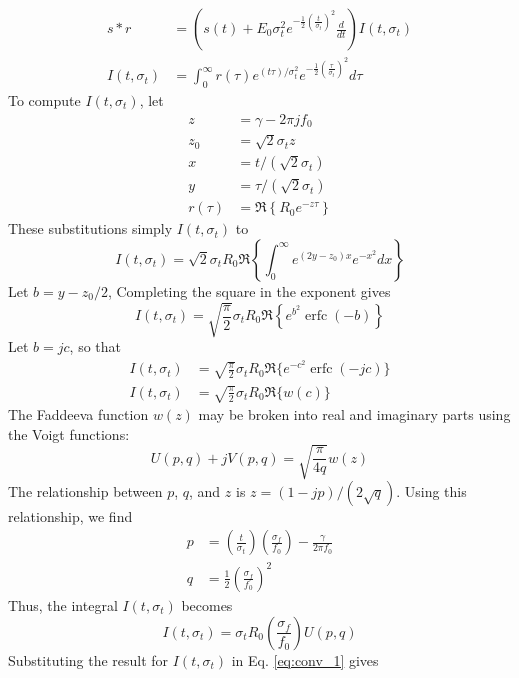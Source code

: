 \documentclass[amsmath,amssymb,aps,prd,10pt,twocolumn,showkeys]{revtex4}
\DeclareMathOperator\erfc{erfc}
\begin{document}
\begin{itemize}
\begin{align}
s * r &= \left(s(t) + E_0 \sigma_t^2 e^{-\frac{1}{2}\left(\frac{t}{\sigma_t}\right)^2} \frac{d}{dt} \right)I(t,\sigma_t) \label{eq:conv_1} \\
I(t,\sigma_t) &= \int_0^{\infty} r(\tau) e^{(t\tau)/\sigma_t^2} e^{-\frac{1}{2}\left(\frac{\tau}{\sigma_t}\right)^2}d\tau
\end{align}
To compute $I(t,\sigma_t)$, let
\begin{align}
z &= \gamma - 2\pi j f_0 \\
z_0 &= \sqrt{2}\sigma_t z\\
x &= t/(\sqrt{2} \sigma_t) \\
y &= \tau/(\sqrt{2} \sigma_t) \\
r(\tau) &= \Re\left\lbrace R_0 e^{-z\tau}\right\rbrace
\end{align}
These substitutions simply $I(t,\sigma_t)$ to
\begin{equation}
I(t,\sigma_t) = \sqrt{2} \sigma_t R_0 \Re \left\lbrace\int_0^{\infty} e^{(2y-z_0)x} e^{-x^2} dx \right\rbrace
\end{equation}
Let $b = y-z_0/2$, Completing the square in the exponent gives
\begin{equation}
I(t,\sigma_t) = \sqrt{\frac{\pi}{2}} \sigma_t R_0 \Re\left\lbrace e^{b^2} \erfc(-b) \right\rbrace
\end{equation}
Let $b = jc$, so that
\begin{align}
I(t,\sigma_t) &= \sqrt{\frac{\pi}{2}} \sigma_t R_0 \Re\lbrace e^{-c^2} \erfc(-jc) \rbrace \\
I(t,\sigma_t) &= \sqrt{\frac{\pi}{2}} \sigma_t R_0 \Re\lbrace w(c) \rbrace
\end{align}
The Faddeeva function $w(z)$ may be broken into real and imaginary parts using the Voigt functions:
\begin{equation}
U(p,q) + jV(p,q) = \sqrt{\frac{\pi}{4q}} w(z)
\end{equation}
The relationship between $p$, $q$, and $z$ is $z=(1-jp)/(2\sqrt{q})$.  Using this relationship, we find
\begin{align}
p &= \left(\frac{t}{\sigma_t}\right)\left(\frac{\sigma_f}{f_0}\right) - \frac{\gamma}{2\pi f_0} \\
q &= \frac{1}{2}\left(\frac{\sigma_f}{f_0}\right)^2
\end{align}
Thus, the integral $I(t,\sigma_t)$ becomes
\begin{equation}
I(t,\sigma_t) = \sigma_t R_0 \left(\frac{\sigma_f}{f_0}\right) U(p,q)
\end{equation}
Substituting the result for $I(t,\sigma_t)$ in Eq. \ref{eq:conv_1} gives

\end{itemize}
\end{document}
